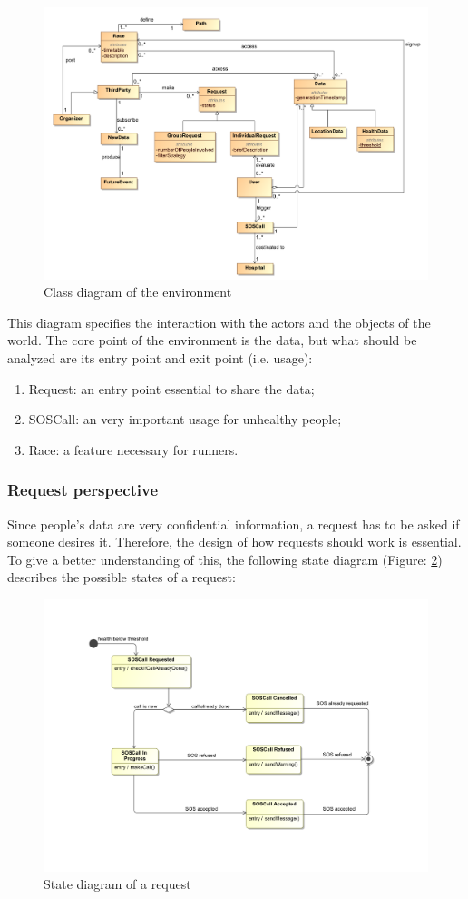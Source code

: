 \begin{figure}[H]
\includegraphics[width=\linewidth]{Images/classdiagram}
\caption{Class diagram of the environment}
\label{fig:classdiagram}
\end{figure}

This diagram specifies the interaction with the actors and the objects of the world. The core point of 
the environment is the data, but what should be analyzed are its entry point and exit point (i.e. usage):

\begin{enumerate}
\item Request: an entry point essential to share the data;
\item SOSCall: an very important usage for unhealthy people;
\item Race: a feature necessary for runners.
\end{enumerate}

\subsubsection{Request perspective}
Since people's data are very confidential information, a request has to be asked if someone desires it. 
Therefore, the design of how requests should work is essential. To give a better understanding of this, 
the following state diagram (Figure: \ref{fig:requestdiagram})  describes the possible states of a request:

\begin{figure}[H]
\includegraphics[width=0.8\linewidth]{Images/sosdiagram}
\caption{State diagram of a request}
\label{fig:requestdiagram}
\end{figure}

